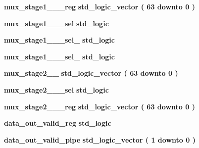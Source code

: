 \begin{DoxyCompactItemize}
\item 
{\bf mux\+\_\+stage1\+\_\+\_\+\_\+reg} {\bfseries \textcolor{comment}{std\+\_\+logic\+\_\+vector}\textcolor{vhdlchar}{ }\textcolor{vhdlchar}{(}\textcolor{vhdlchar}{ }\textcolor{vhdlchar}{ } \textcolor{vhdldigit}{63} \textcolor{vhdlchar}{ }\textcolor{keywordflow}{downto}\textcolor{vhdlchar}{ }\textcolor{vhdlchar}{ } \textcolor{vhdldigit}{0} \textcolor{vhdlchar}{ }\textcolor{vhdlchar}{)}\textcolor{vhdlchar}{ }} 
\item 
{\bf mux\+\_\+stage1\+\_\+\_\+\_\+sel} {\bfseries \textcolor{comment}{std\+\_\+logic}\textcolor{vhdlchar}{ }} 
\item 
{\bf mux\+\_\+stage1\+\_\+\_\+\_\+sel\+\_} {\bfseries \textcolor{comment}{std\+\_\+logic}\textcolor{vhdlchar}{ }} 
\item 
{\bf mux\+\_\+stage1\+\_\+\_\+\_\+sel\+\_} {\bfseries \textcolor{comment}{std\+\_\+logic}\textcolor{vhdlchar}{ }} 
\item 
{\bf mux\+\_\+stage2\+\_\+\_} {\bfseries \textcolor{comment}{std\+\_\+logic\+\_\+vector}\textcolor{vhdlchar}{ }\textcolor{vhdlchar}{(}\textcolor{vhdlchar}{ }\textcolor{vhdlchar}{ } \textcolor{vhdldigit}{63} \textcolor{vhdlchar}{ }\textcolor{keywordflow}{downto}\textcolor{vhdlchar}{ }\textcolor{vhdlchar}{ } \textcolor{vhdldigit}{0} \textcolor{vhdlchar}{ }\textcolor{vhdlchar}{)}\textcolor{vhdlchar}{ }} 
\item 
{\bf mux\+\_\+stage2\+\_\+\_\+\_\+sel} {\bfseries \textcolor{comment}{std\+\_\+logic}\textcolor{vhdlchar}{ }} 
\item 
{\bf mux\+\_\+stage2\+\_\+\_\+\_\+reg} {\bfseries \textcolor{comment}{std\+\_\+logic\+\_\+vector}\textcolor{vhdlchar}{ }\textcolor{vhdlchar}{(}\textcolor{vhdlchar}{ }\textcolor{vhdlchar}{ } \textcolor{vhdldigit}{63} \textcolor{vhdlchar}{ }\textcolor{keywordflow}{downto}\textcolor{vhdlchar}{ }\textcolor{vhdlchar}{ } \textcolor{vhdldigit}{0} \textcolor{vhdlchar}{ }\textcolor{vhdlchar}{)}\textcolor{vhdlchar}{ }} 
\item 
{\bf data\+\_\+out\+\_\+valid\+\_\+reg} {\bfseries \textcolor{comment}{std\+\_\+logic}\textcolor{vhdlchar}{ }} 
\item 
{\bf data\+\_\+out\+\_\+valid\+\_\+pipe} {\bfseries \textcolor{comment}{std\+\_\+logic\+\_\+vector}\textcolor{vhdlchar}{ }\textcolor{vhdlchar}{(}\textcolor{vhdlchar}{ }\textcolor{vhdlchar}{ } \textcolor{vhdldigit}{1} \textcolor{vhdlchar}{ }\textcolor{keywordflow}{downto}\textcolor{vhdlchar}{ }\textcolor{vhdlchar}{ } \textcolor{vhdldigit}{0} \textcolor{vhdlchar}{ }\textcolor{vhdlchar}{)}\textcolor{vhdlchar}{ }} 
\end{DoxyCompactItemize}


